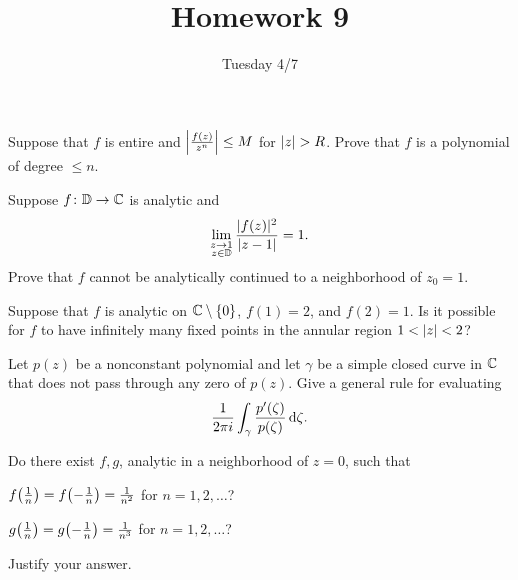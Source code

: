\documentclass{../math135}
\title{Homework 9}
\author{}
\date{Tuesday 4/7}
\begin{document}
\begin{exercise}
	Suppose that \(f\) is entire and \(\abs* {\frac {f(z)} {z^n}} \le
  M\) for \(\abs z > R\).  Prove that \(f\) is a polynomial of degree
  \(\leq n\).

  \begin{solution}

  \end{solution}
\end{exercise}

\begin{exercise}
	Suppose \(f \colon \DD \to \CC\) is analytic and
  \[
		\lim_{\substack{z \to 1 \\ z \in \DD}}
    \frac{\abs{f(z)}^2}{\abs{z-1}} = 1.
  \]
	Prove that \(f\) cannot be analytically continued to a neighborhood
  of \(z_0 = 1\).

  \begin{solution}

  \end{solution}
\end{exercise}

\begin{exercise}
    Suppose that \(f\) is analytic on
  \(\CC \setminus \set 0\), \(f(1) = 2\), and \(f(2) = 1\).  Is it
  possible for \(f\) to have infinitely many fixed points in the
  annular region \(1 < \abs z < 2\)?

  \begin{solution}

  \end{solution}
\end{exercise}

\begin{exercise}
	Let \(p(z)\) be a nonconstant polynomial and let \(\gamma\) be a
  simple closed curve in \(\CC\) that does not pass through any zero
  of \(p(z)\).  Give a general rule for evaluating
  \[
		\frac{1}{2 \pi i} \int_\gamma
    \frac{p'(\zeta)}{p(\zeta)} \dif \zeta.
  \]

  \begin{solution}

  \end{solution}
\end{exercise}

\begin{exercise}
	Do there exist \(f, g\), analytic in a neighborhood of \(z = 0\),
  such that
  \begin{problems}
  \item \(f \prn*{\frac 1 n} = f \prn*{-\frac 1 n} = \frac{1}{n^2}\)
    for \(n = 1, 2, \dots\)?
  \item \(g \prn*{\frac 1 n} = g \prn*{-\frac 1 n} = \frac{1}{n^3}\)
    for \(n = 1, 2, \dots\)?
  \end{problems}
	Justify your answer.

  \begin{solution}

  \end{solution}
\end{exercise}
\end{document}
